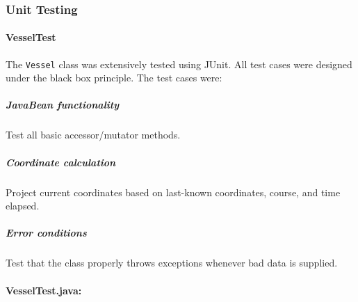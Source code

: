 \documentclass{article}
\begin{document}

\subsubsection{Unit Testing} %



\paragraph{VesselTest}

The \verb|Vessel| class was extensively tested using JUnit. All test cases were designed under the black box principle. The test cases were:

\subparagraph{JavaBean functionality}
Test all basic accessor/mutator methods.

\subparagraph{Coordinate calculation}
Project current coordinates based on last-known coordinates, course, and time elapsed.

\subparagraph{Error conditions}
Test that the class properly throws exceptions whenever bad data is supplied.

\paragraph{VesselTest.java:}
\end{document}
